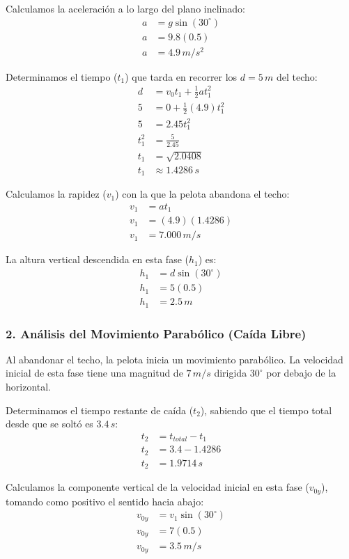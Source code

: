 \documentclass[12pt, a4paper]{article}
\begin{document}
Calculamos la aceleración a lo largo del plano inclinado:
\begin{align*}
a &= g \sin(30^\circ) \\
a &= 9.8 (0.5) \\
a &= 4.9 \, \si{m/s^2}
\end{align*}

Determinamos el tiempo ($t_1$) que tarda en recorrer los $d = 5 \, \si{m}$ del techo:
\begin{align*}
d &= v_0 t_1 + \frac{1}{2} a t_1^2 \\
5 &= 0 + \frac{1}{2} (4.9) t_1^2 \\
5 &= 2.45 t_1^2 \\
t_1^2 &= \frac{5}{2.45} \\
t_1 &= \sqrt{2.0408} \\
t_1 &\approx 1.4286 \, \si{s}
\end{align*}

Calculamos la rapidez ($v_1$) con la que la pelota abandona el techo:
\begin{align*}
v_1 &= a t_1 \\
v_1 &= (4.9)(1.4286) \\
v_1 &= 7.000 \, \si{m/s}
\end{align*}

La altura vertical descendida en esta fase ($h_1$) es:
\begin{align*}
h_1 &= d \sin(30^\circ) \\
h_1 &= 5 (0.5) \\
h_1 &= 2.5 \, \si{m}
\end{align*}

\subsubsection*{2. Análisis del Movimiento Parabólico (Caída Libre)}
Al abandonar el techo, la pelota inicia un movimiento parabólico. La velocidad inicial de esta fase tiene una magnitud de $7 \, \si{m/s}$ dirigida $30^\circ$ por debajo de la horizontal.

Determinamos el tiempo restante de caída ($t_2$), sabiendo que el tiempo total desde que se soltó es $3.4 \, \si{s}$:
\begin{align*}
t_2 &= t_{total} - t_1 \\
t_2 &= 3.4 - 1.4286 \\
t_2 &= 1.9714 \, \si{s}
\end{align*}

Calculamos la componente vertical de la velocidad inicial en esta fase ($v_{0y}$), tomando como positivo el sentido hacia abajo:
\begin{align*}
v_{0y} &= v_1 \sin(30^\circ) \\
v_{0y} &= 7 (0.5) \\
v_{0y} &= 3.5 \, \si{m/s}
\end{align*}
\end{document}
